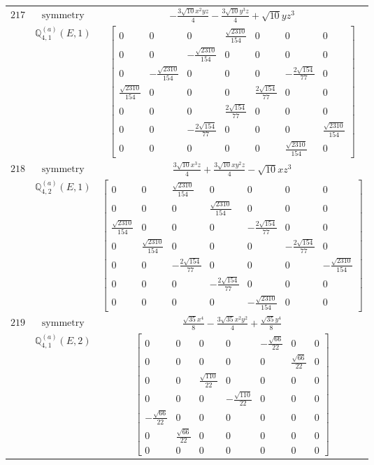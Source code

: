 \documentclass[fleqn,8pt,landscape]{jsarticle}
\begin{document}
\begin{longtable}{ccc}
$ 217 $ & $ \text{symmetry} $ & $ - \frac{3 \sqrt{10} x^{2} y z}{4} - \frac{3 \sqrt{10} y^{3} z}{4} + \sqrt{10} y z^{3} $ \\
$  $ & $ \mathbb{Q}_{4,1}^{(a)}(E,1) $ & $ \begin{bmatrix} 0 & 0 & 0 & \frac{\sqrt{2310}}{154} & 0 & 0 & 0 \\ 0 & 0 & - \frac{\sqrt{2310}}{154} & 0 & 0 & 0 & 0 \\ 0 & - \frac{\sqrt{2310}}{154} & 0 & 0 & 0 & - \frac{2 \sqrt{154}}{77} & 0 \\ \frac{\sqrt{2310}}{154} & 0 & 0 & 0 & \frac{2 \sqrt{154}}{77} & 0 & 0 \\ 0 & 0 & 0 & \frac{2 \sqrt{154}}{77} & 0 & 0 & 0 \\ 0 & 0 & - \frac{2 \sqrt{154}}{77} & 0 & 0 & 0 & \frac{\sqrt{2310}}{154} \\ 0 & 0 & 0 & 0 & 0 & \frac{\sqrt{2310}}{154} & 0 \end{bmatrix} $ \\ \hline
$ 218 $ & $ \text{symmetry} $ & $ \frac{3 \sqrt{10} x^{3} z}{4} + \frac{3 \sqrt{10} x y^{2} z}{4} - \sqrt{10} x z^{3} $ \\
$  $ & $ \mathbb{Q}_{4,2}^{(a)}(E,1) $ & $ \begin{bmatrix} 0 & 0 & \frac{\sqrt{2310}}{154} & 0 & 0 & 0 & 0 \\ 0 & 0 & 0 & \frac{\sqrt{2310}}{154} & 0 & 0 & 0 \\ \frac{\sqrt{2310}}{154} & 0 & 0 & 0 & - \frac{2 \sqrt{154}}{77} & 0 & 0 \\ 0 & \frac{\sqrt{2310}}{154} & 0 & 0 & 0 & - \frac{2 \sqrt{154}}{77} & 0 \\ 0 & 0 & - \frac{2 \sqrt{154}}{77} & 0 & 0 & 0 & - \frac{\sqrt{2310}}{154} \\ 0 & 0 & 0 & - \frac{2 \sqrt{154}}{77} & 0 & 0 & 0 \\ 0 & 0 & 0 & 0 & - \frac{\sqrt{2310}}{154} & 0 & 0 \end{bmatrix} $ \\ \hline
$ 219 $ & $ \text{symmetry} $ & $ \frac{\sqrt{35} x^{4}}{8} - \frac{3 \sqrt{35} x^{2} y^{2}}{4} + \frac{\sqrt{35} y^{4}}{8} $ \\
$  $ & $ \mathbb{Q}_{4,1}^{(a)}(E,2) $ & $ \begin{bmatrix} 0 & 0 & 0 & 0 & - \frac{\sqrt{66}}{22} & 0 & 0 \\ 0 & 0 & 0 & 0 & 0 & \frac{\sqrt{66}}{22} & 0 \\ 0 & 0 & \frac{\sqrt{110}}{22} & 0 & 0 & 0 & 0 \\ 0 & 0 & 0 & - \frac{\sqrt{110}}{22} & 0 & 0 & 0 \\ - \frac{\sqrt{66}}{22} & 0 & 0 & 0 & 0 & 0 & 0 \\ 0 & \frac{\sqrt{66}}{22} & 0 & 0 & 0 & 0 & 0 \\ 0 & 0 & 0 & 0 & 0 & 0 & 0 \end{bmatrix} $ \\ \hline

\end{longtable}
\end{document}
